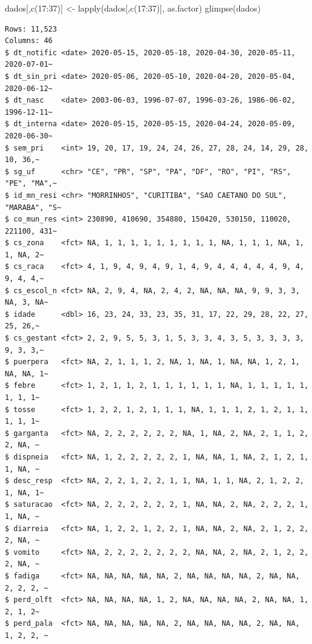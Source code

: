 \documentclass[
  letterpaper,
  DIV=11,
  numbers=noendperiod]{scrreprt}
\newenvironment{Shaded}{\begin{snugshade}}{\end{snugshade}}
\newcommand{\DecValTok}[1]{\textcolor[rgb]{0.68,0.00,0.00}{#1}}
\newcommand{\FunctionTok}[1]{\textcolor[rgb]{0.28,0.35,0.67}{#1}}
\newcommand{\NormalTok}[1]{\textcolor[rgb]{0.00,0.23,0.31}{#1}}
\newcommand{\OtherTok}[1]{\textcolor[rgb]{0.00,0.23,0.31}{#1}}
\newcommand{\SpecialCharTok}[1]{\textcolor[rgb]{0.37,0.37,0.37}{#1}}
\begin{document}
\begin{Shaded}
\begin{Highlighting}[]
\NormalTok{dados[,}\FunctionTok{c}\NormalTok{(}\DecValTok{17}\SpecialCharTok{:}\DecValTok{37}\NormalTok{)] }\OtherTok{\textless{}{-}} \FunctionTok{lapply}\NormalTok{(dados[,}\FunctionTok{c}\NormalTok{(}\DecValTok{17}\SpecialCharTok{:}\DecValTok{37}\NormalTok{)], as.factor)}
\FunctionTok{glimpse}\NormalTok{(dados)}
\end{Highlighting}
\end{Shaded}

\begin{verbatim}
Rows: 11,523
Columns: 46
$ dt_notific <date> 2020-05-15, 2020-05-18, 2020-04-30, 2020-05-11, 2020-07-01~
$ dt_sin_pri <date> 2020-05-06, 2020-05-10, 2020-04-20, 2020-05-04, 2020-06-12~
$ dt_nasc    <date> 2003-06-03, 1996-07-07, 1996-03-26, 1986-06-02, 1996-12-11~
$ dt_interna <date> 2020-05-15, 2020-05-15, 2020-04-24, 2020-05-09, 2020-06-30~
$ sem_pri    <int> 19, 20, 17, 19, 24, 24, 26, 27, 28, 24, 14, 29, 28, 10, 36,~
$ sg_uf      <chr> "CE", "PR", "SP", "PA", "DF", "RO", "PI", "RS", "PE", "MA",~
$ id_mn_resi <chr> "MORRINHOS", "CURITIBA", "SAO CAETANO DO SUL", "MARABA", "S~
$ co_mun_res <int> 230890, 410690, 354880, 150420, 530150, 110020, 221100, 431~
$ cs_zona    <fct> NA, 1, 1, 1, 1, 1, 1, 1, 1, 1, NA, 1, 1, 1, NA, 1, 1, NA, 2~
$ cs_raca    <fct> 4, 1, 9, 4, 9, 4, 9, 1, 4, 9, 4, 4, 4, 4, 4, 9, 4, 9, 4, 4,~
$ cs_escol_n <fct> NA, 2, 9, 4, NA, 2, 4, 2, NA, NA, NA, 9, 9, 3, 3, NA, 3, NA~
$ idade      <dbl> 16, 23, 24, 33, 23, 35, 31, 17, 22, 29, 28, 22, 27, 25, 26,~
$ cs_gestant <fct> 2, 2, 9, 5, 5, 3, 1, 5, 3, 3, 4, 3, 5, 3, 3, 3, 3, 9, 3, 3,~
$ puerpera   <fct> NA, 2, 1, 1, 1, 2, NA, 1, NA, 1, NA, NA, 1, 2, 1, NA, NA, 1~
$ febre      <fct> 1, 2, 1, 1, 2, 1, 1, 1, 1, 1, 1, NA, 1, 1, 1, 1, 1, 1, 1, 1~
$ tosse      <fct> 1, 2, 2, 1, 2, 1, 1, 1, NA, 1, 1, 1, 2, 1, 2, 1, 1, 1, 1, 1~
$ garganta   <fct> NA, 2, 2, 2, 2, 2, 2, NA, 1, NA, 2, NA, 2, 1, 1, 2, 2, NA, ~
$ dispneia   <fct> NA, 1, 2, 2, 2, 2, 2, 1, NA, NA, 1, NA, 2, 1, 2, 1, 1, NA, ~
$ desc_resp  <fct> NA, 2, 2, 1, 2, 2, 1, 1, NA, 1, 1, NA, 2, 1, 2, 2, 1, NA, 1~
$ saturacao  <fct> NA, 2, 2, 2, 2, 2, 2, 1, NA, NA, 2, NA, 2, 2, 2, 1, 1, NA, ~
$ diarreia   <fct> NA, 1, 2, 2, 1, 2, 2, 1, NA, NA, 2, NA, 2, 1, 2, 2, 2, NA, ~
$ vomito     <fct> NA, 2, 2, 2, 2, 2, 2, 2, NA, NA, 2, NA, 2, 1, 2, 2, 2, NA, ~
$ fadiga     <fct> NA, NA, NA, NA, NA, 2, NA, NA, NA, NA, 2, NA, NA, 2, 2, 2, ~
$ perd_olft  <fct> NA, NA, NA, NA, 1, 2, NA, NA, NA, NA, 2, NA, NA, 1, 2, 1, 2~
$ perd_pala  <fct> NA, NA, NA, NA, NA, 2, NA, NA, NA, NA, 2, NA, NA, 1, 2, 2, ~

\end{verbatim}
\end{document}
